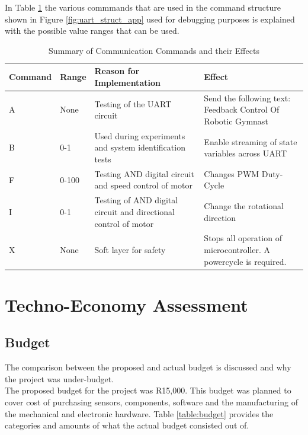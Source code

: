 In Table \ref{table:uart_commands} the various commmands that are used in the command structure shown in Figure \ref{fig:uart_struct_app} used for debugging purposes is explained with the possible value ranges that can be used.


\begin{table}[h]
	\centering
	\begin{tabular}{|p{2cm}|p{1cm}|p{5cm}|p{5cm}|}
		\hline
		Command & Range &  Reason for Implementation & Effect \\
		\hline
		\hline
		A & None & Testing of the UART circuit & Send the following text: Feedback Control Of Robotic Gymnast\\
		\hline
		B & 0-1 & Used during experiments and system identification tests& Enable streaming of state variables across UART \\ 
		\hline
		F & 0-100 &  Testing AND digital circuit and speed control of motor& Changes PWM Duty-Cycle \\
		\hline
		I & 0-1 & Testing of AND digital circuit and directional control of motor & Change the rotational direction \\
		\hline
		X & None & Soft layer for safety & Stops all operation of microcontroller. A powercycle is required.   \\
		\hline
	
	\end{tabular}
	\caption{Summary of Communication Commands and their Effects}
	\label{table:uart_commands}

\end{table}


\newpage


%





\section{Techno-Economy Assessment}
\label{sec:techno_eco}

\subsection{Budget}
The comparison between the proposed and actual budget is discussed and why the project was under-budget.\\

The proposed budget for the project was R15,000. This budget was planned to cover cost of purchasing sensors, components, software and the manufacturing of the mechanical and electronic hardware. Table \ref{table:budget} provides the categories and amounts of what the actual budget consisted out of.\\

